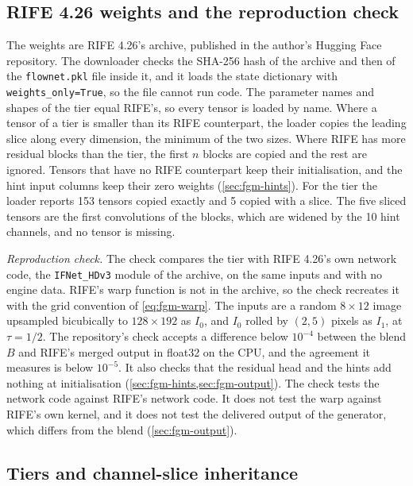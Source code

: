 \subsection{RIFE 4.26 weights and the reproduction check}\label{sec:fgm-weights}

The weights are RIFE 4.26's archive, published in the author's Hugging Face repository. The downloader checks the SHA-256 hash of the archive and then of the \texttt{flownet.pkl} file inside it, and it loads the state dictionary with \texttt{weights\_only=True}, so the file cannot run code. The parameter names and shapes of the  tier equal RIFE's, so every tensor is loaded by name. Where a tensor of a tier is smaller than its RIFE counterpart, the loader copies the leading slice along every dimension, the minimum of the two sizes. Where RIFE has more residual blocks than the tier, the first $n$ blocks are copied and the rest are ignored. Tensors that have no RIFE counterpart keep their initialisation, and the hint input columns keep their zero weights (\cref{sec:fgm-hints}). For the  tier the loader reports 153 tensors copied exactly and 5 copied with a slice. The five sliced tensors are the first convolutions of the blocks, which are widened by the 10 hint channels, and no tensor is missing.

\emph{Reproduction check.} The check compares the  tier with RIFE 4.26's own network code, the \texttt{IFNet\_HDv3} module of the archive, on the same inputs and with no engine data. RIFE's warp function is not in the archive, so the check recreates it with the grid convention of \cref{eq:fgm-warp}. The inputs are a random $8\times12$ image upsampled bicubically to $128\times192$ as $I_0$, and $I_0$ rolled by $(2,5)$ pixels as $I_1$, at $\tau=1/2$. The repository's check accepts a difference below $10^{-4}$ between the blend $B$ and RIFE's merged output in float32 on the CPU, and the agreement it measures is below $10^{-5}$. It also checks that the residual head and the hints add nothing at initialisation (\cref{sec:fgm-hints,sec:fgm-output}). The check tests the network code against RIFE's network code. It does not test the warp against RIFE's own kernel, and it does not test the delivered output of the generator, which differs from the blend (\cref{sec:fgm-output}).

\subsection{Tiers and channel-slice inheritance}\label{sec:fgm-tiers}

